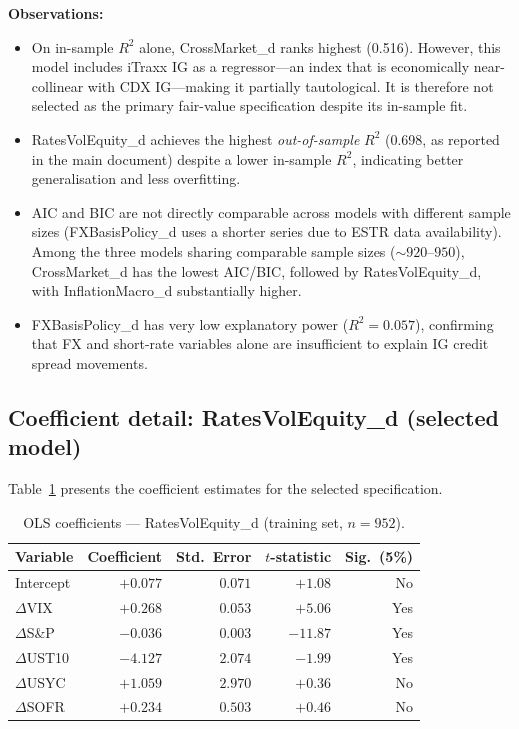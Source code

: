 \textbf{Observations:}
\begin{itemize}
  \item On in-sample \(R^2\) alone, CrossMarket\_d ranks highest (0.516).
    However, this model includes iTraxx IG as a regressor---an index that is
    economically near-collinear with CDX IG---making it partially tautological.
    It is therefore not selected as the primary fair-value specification despite
    its in-sample fit.
  \item RatesVolEquity\_d achieves the highest \emph{out-of-sample} \(R^2\)
    (0.698, as reported in the main document) despite a lower in-sample \(R^2\),
    indicating better generalisation and less overfitting.
  \item AIC and BIC are not directly comparable across models with different
    sample sizes (FXBasisPolicy\_d uses a shorter series due to ESTR data
    availability). Among the three models sharing comparable sample sizes
    (\(\sim\!920\)--\(950\)), CrossMarket\_d has the lowest AIC/BIC, followed
    by RatesVolEquity\_d, with InflationMacro\_d substantially higher.
  \item FXBasisPolicy\_d has very low explanatory power (\(R^2 = 0.057\)),
    confirming that FX and short-rate variables alone are insufficient to
    explain IG credit spread movements.
\end{itemize}

\subsection*{Coefficient detail: RatesVolEquity\_d (selected model)}

Table~\ref{tab:coef_rve} presents the coefficient estimates for the selected
specification.

\begin{table}[H]
\centering
\small
\caption{OLS coefficients --- RatesVolEquity\_d (training set, \(n = 952\)).}
\label{tab:coef_rve}
\begin{tabular}{lrrrr}
\toprule
Variable & Coefficient & Std.\ Error & \(t\)-statistic & Sig.\ (5\%) \\
\midrule
Intercept      &  $+0.077$ & $0.071$ &  $+1.08$ & No  \\
\(\Delta\)VIX  &  $+0.268$ & $0.053$ &  $+5.06$ & Yes \\
\(\Delta\)S\&P &  $-0.036$ & $0.003$ & $-11.87$ & Yes \\
\(\Delta\)UST10 & $-4.127$ & $2.074$ &  $-1.99$ & Yes \\
\(\Delta\)USYC &  $+1.059$ & $2.970$ &  $+0.36$ & No  \\
\(\Delta\)SOFR &  $+0.234$ & $0.503$ &  $+0.46$ & No  \\
\bottomrule
\end{tabular}
\end{table}


